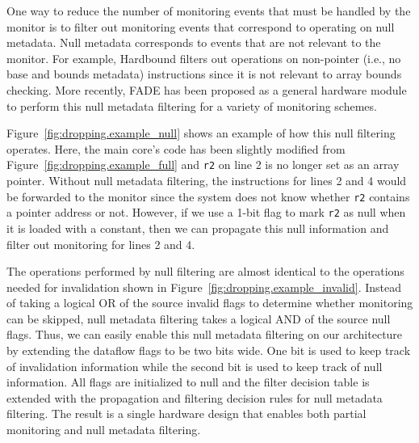 One way to reduce the number of monitoring events that must be handled by the
monitor is to filter out monitoring events that correspond to operating on null
metadata. Null metadata corresponds to events that
are not relevant to the monitor. For example, Hardbound
\cite{hardbound-asplos08} filters out operations on non-pointer (i.e., no base
and bounds metadata) instructions since it is not relevant to array bounds
checking. More recently, FADE \cite{fade-hpca14} has been proposed as a general
hardware module to perform this null metadata filtering for a variety of
monitoring schemes. 

Figure~\ref{fig:dropping.example_null} shows an example of how this null filtering operates.
Here, the main core's code has been slightly modified from
Figure~\ref{fig:dropping.example_full} and {\tt r2} on line 2 is no longer set as an array pointer.
Without null metadata filtering, the instructions for lines 2 and 4 would be
forwarded to the monitor since the system does not know whether {\tt r2}
contains a pointer address or not. However, if we use a 1-bit flag to mark {\tt r2}
as null when it is loaded with a constant, then we can propagate this null
information and filter out monitoring for lines 2 and 4.

The operations performed by null filtering are almost identical to the
operations needed for invalidation shown in
Figure~\ref{fig:dropping.example_invalid}. Instead of taking a logical OR of the
source invalid flags to determine whether monitoring can be skipped, null
metadata filtering takes a logical AND of the source null flags.
Thus, we can easily enable this null metadata filtering on our architecture by
extending the dataflow flags to be two bits wide. One bit is used to
keep track of invalidation information while the second bit is used to keep
track of null information. All flags are initialized to null and the filter
decision table is extended with the propagation and filtering decision rules
for null metadata filtering.
The result is a single hardware design that enables both partial
monitoring and null metadata filtering.


